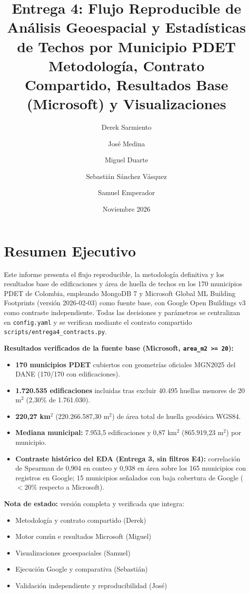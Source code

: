 \documentclass[11pt, a4paper]{article}
\title{\textbf{Entrega 4: Flujo Reproducible de Análisis Geoespacial y Estadísticas de Techos por Municipio PDET} \\
\large Metodología, Contrato Compartido, Resultados Base (Microsoft) y Visualizaciones}
\author{Derek Sarmiento \and José Medina \and Miguel Duarte \and Sebastián Sánchez Vásquez \and Samuel Emperador}
\date{Noviembre 2026}
\begin{document}
\maketitle

\newpage
\tableofcontents
\newpage

\section*{Resumen Ejecutivo}

Este informe presenta el flujo reproducible, la metodología definitiva y los resultados base de edificaciones y área de huella de techos en los 170 municipios PDET de Colombia, empleando MongoDB 7 y Microsoft Global ML Building Footprints (versión 2026-02-03) como fuente base, con Google Open Buildings v3 como contraste independiente. Todas las decisiones y parámetros se centralizan en \texttt{config.yaml} y se verifican mediante el contrato compartido \texttt{scripts/entrega4\_contracts.py}.

\textbf{Resultados verificados de la fuente base (Microsoft, \texttt{area\_m2 >= 20}):}
\begin{itemize}
    \item \textbf{170 municipios PDET} cubiertos con geometrías oficiales MGN2025 del DANE (170/170 con edificaciones).
    \item \textbf{1.720.535 edificaciones} incluidas tras excluir 40.495 huellas menores de 20 m$^2$ (2,30\% de 1.761.030).
    \item \textbf{220,27 km$^2$} (220.266.587,30 m$^2$) de área total de huella geodésica WGS84.
    \item \textbf{Mediana municipal:} 7.953,5 edificaciones y 0,87 km$^2$ (865.919,23 m$^2$) por municipio.
    \item \textbf{Contraste histórico del EDA (Entrega 3, sin filtros E4):} correlación de Spearman de 0,904 en conteo y 0,938 en área sobre los 165 municipios con registros en Google; 15 municipios señalados con baja cobertura de Google ($< 20\%$ respecto a Microsoft).
\end{itemize}

\textbf{Nota de estado:} versión completa y verificada que integra:
\begin{itemize}
    \item Metodología y contrato compartido (Derek)
    \item Motor común e resultados Microsoft (Miguel)
    \item Visualizaciones geoespaciales (Samuel)
    \item Ejecución Google y comparativa (Sebastián)
    \item Validación independiente y reproducibilidad (José)
\end{itemize}
\end{document}
